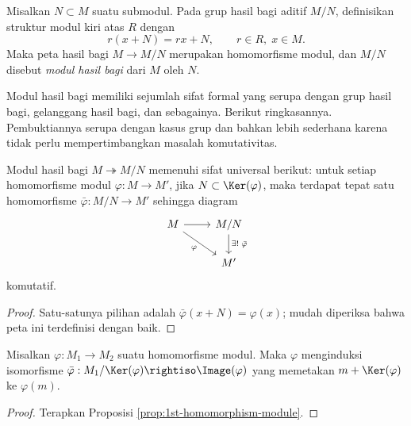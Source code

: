 \begin{definition}
	Misalkan $N \subset M$ suatu submodul. Pada grup hasil bagi aditif $M/N$, definisikan struktur modul kiri atas $R$ dengan
	\[ r (x+N) = rx + N, \qquad r \in R, \; x \in M. \]
	Maka peta hasil bagi $M \to M/N$ merupakan homomorfisme modul, dan $M/N$ disebut \emph{modul hasil bagi} dari $M$ oleh $N$.
\end{definition}

Modul hasil bagi memiliki sejumlah sifat formal yang serupa dengan grup hasil bagi, gelanggang hasil bagi, dan sebagainya. Berikut ringkasannya. Pembuktiannya serupa dengan kasus grup dan bahkan lebih sederhana karena tidak perlu mempertimbangkan masalah komutativitas.

\begin{proposition}\label{prop:1st-homomorphism-module}
	Modul hasil bagi $M \twoheadrightarrow M/N$ memenuhi sifat universal berikut: untuk setiap homomorfisme modul $\varphi: M \to M'$, jika $N \subset \Ker(\varphi)$, maka terdapat tepat satu homomorfisme $\bar{\varphi}: M/N \to M'$ sehingga diagram
	\[ \begin{tikzcd}
		M \arrow[rd, "\varphi"'] \arrow[r] & M/N \arrow[d, "{\exists! \; \bar{\varphi}}"]\\
		& M'
	\end{tikzcd}\]
	komutatif.
\end{proposition}
\begin{proof}
	Satu-satunya pilihan adalah $\bar{\varphi}(x + N) = \varphi(x)$; mudah diperiksa bahwa peta ini terdefinisi dengan baik.
\end{proof}

\begin{proposition}\label{prop:quotient-image-module}
	Misalkan $\varphi: M_1 \to M_2$ suatu homomorfisme modul. Maka $\varphi$ menginduksi isomorfisme $\bar{\varphi}: M_1/\Ker(\varphi) \rightiso \Image(\varphi)$ yang memetakan $m + \Ker(\varphi)$ ke $\varphi(m)$.
\end{proposition}
\begin{proof}
	Terapkan Proposisi \ref{prop:1st-homomorphism-module}.
\end{proof}

